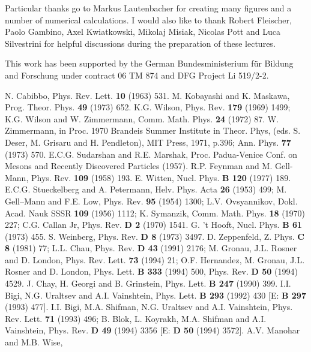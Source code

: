 Particular thanks go to Markus Lautenbacher for creating many figures
and a number of numerical calculations. 
I would also like to thank Robert Fleischer, Paolo Gambino, 
Axel Kwiatkowski, Mikolaj Misiak, Nicolas Pott
and Luca Silvestrini for helpful discussions during  the preparation of
these lectures. 

This work has been supported by the
German Bundesministerium f{\"u}r Bildung and Forschung under contract 
06 TM 874  and DFG Project Li 519/2-2.

\begin{thebibliography}{999}
N. Cabibbo, Phys. Rev. Lett. {\bf 10} (1963) 531.
{ M. Kobayashi and K. Maskawa},
 { Prog. Theor. Phys.} {\bf 49} (1973) 652.
K.G. Wilson, { Phys. Rev.} {\bf 179} (1969) 1499;
K.G. Wilson and W. Zimmermann, { Comm. Math. Phys.} 
{\bf 24} (1972) 87.
W. Zimmermann, in Proc. 1970 Brandeis Summer Institute in
Theor. Phys, (eds. S. Deser, M. Grisaru and H. Pendleton),
MIT Press, 1971, p.396; 
{ Ann. Phys.} {\bf 77} (1973) 570.
{ E.C.G. Sudarshan and R.E. Marshak}, Proc. Padua-Venice Conf. on 
Mesons and Recently Discovered Particles (1957).
{ R.P. Feynman and M. Gell-Mann,}
 { Phys. Rev.} {\bf 109} (1958) 193.
E. Witten, { Nucl. Phys.} {\bf B 120} (1977) 189.
E.C.G. Stueckelberg and A. Petermann, Helv. Phys. Acta {\bf 26} (1953)
499;
M. Gell--Mann and F.E. Low, { Phys. Rev.} {\bf 95} (1954) 1300;
L.V. Ovsyannikov, Dokl. Acad. Nauk SSSR {\bf 109} (1956) 1112;
K. Symanzik, Comm. Math. Phys. {\bf 18} (1970) 227;
C.G. Callan Jr, { Phys. Rev.} {\bf D 2} (1970) 1541.
G. 't Hooft,
{ Nucl. Phys.} {\bf B 61} (1973) 455.
S. Weinberg, { Phys. Rev.} {\bf D 8} (1973) 3497.
D. Zeppenfeld, Z. Phys. {\bf C 8} (1981) 77;
L.L. Chau, { Phys. Rev.} {\bf D 43} (1991) 2176;
M. Gronau, J.L. Rosner and D. London, Phys. Rev. Lett. {\bf 73} (1994) 21;
O.F. Hernandez, M. Gronau, J.L. Rosner and D. London,
{ Phys. Lett.} {\bf B 333} (1994) 500, { Phys. Rev.} {\bf D 50} (1994) 4529.
J. Chay, H. Georgi and B. Grinstein,
{ Phys. Lett.} {\bf B 247} (1990) 399.
I.I. Bigi, N.G. Uraltsev and A.I. Vainshtein,
{ Phys. Lett.} {\bf B 293} (1992) 430
[E: {\bf B 297} (1993) 477].
I.I. Bigi, M.A. Shifman, N.G. Uraltsev and A.I. Vainshtein,
Phys. Rev. Lett. {\bf 71} (1993) 496;
B. Blok, L. Koyrakh, M.A. Shifman and A.I. Vainshtein,
{ Phys. Rev.} {\bf D 49} (1994) 3356 [E: {\bf D 50} (1994) 3572].
A.V. Manohar and M.B. Wise,

\end{thebibliography}
